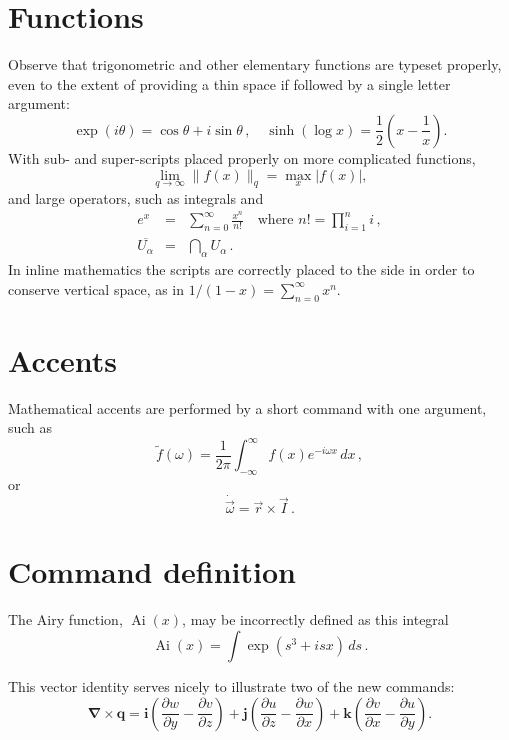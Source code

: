 \documentclass[20pt,a4paper]{extarticle}
\begin{document}
\section{Functions}

Observe that trigonometric and other elementary functions are typeset 
properly, even to the extent of providing a thin space if followed by 
a single letter argument:
\[
	\exp(i\theta)=\cos\theta +i\sin\theta\,,\quad
	\sinh(\log x)=\frac{1}{2}\left( x-\frac{1}{x} \right).
\]
With sub- and super-scripts placed properly on more complicated 
functions,
\[
	\lim_{q\to\infty}\|f(x)\|_q 
	=\max_{x}|f(x)|,
\]
and large operators, such as integrals and
\begin{eqnarray*}
	e^x & = & \sum_{n=0}^\infty \frac{x^n}{n!}
	\quad\text{where }n!=\prod_{i=1}^n i\,,  \\
	\overline{U_\alpha} & = & \bigcap_\alpha U_\alpha\,.
\end{eqnarray*}
In inline mathematics the scripts are correctly placed to the side in 
order to conserve vertical space, as in
\(
	1/(1-x)=\sum_{n=0}^\infty x^n.
\)






\section{Accents}

Mathematical accents are performed by a short command with one 
argument, such as
\[
	\tilde f(\omega)=\frac{1}{2\pi}
	\int_{-\infty}^\infty f(x)e^{-i\omega x}\,dx\,,
\]
or
\[
	\dot{\vec \omega}=\vec r\times\vec I\,.
\]





\section{Command definition}

\newcommand{\Ai}{\operatorname{Ai}} 
The Airy function, $\Ai(x)$, may be incorrectly defined as this 
integral
\[
	\Ai(x)=\int\exp(s^3+isx)\,ds\,.
\]

\newcommand{\D}[2]{\frac{\partial #2}{\partial #1}}
\newcommand{\DD}[2]{\frac{\partial^2 #2}{\partial #1^2}}
\renewcommand{\vec}[1]{\boldsymbol{#1}}

This vector identity serves nicely to illustrate two of the new 
commands:
\[
	\vec\nabla\times\vec q
	=\vec i\left(\D yw-\D zv\right)
	+\vec j\left(\D zu-\D xw\right)
	+\vec k\left(\D xv-\D yu\right).
\]
\end{document}
